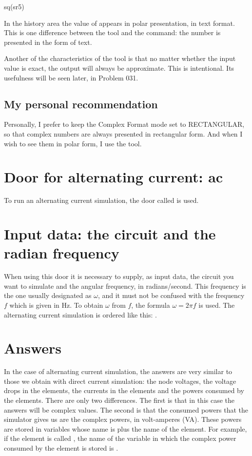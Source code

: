 \begin{entry}
sq\absang(sr5)
\end{entry}

In the history area the value of  appears in polar
presentation, in text format. This is one difference between the
 tool and the  command: the number is
presented in the form of text.

Another of the characteristics of the  tool is that no
matter whether the input value is exact, the output will always be
approximate. This is intentional. Its usefulness will be seen later,
in Problem 031.

\subsection{My personal recommendation}

Personally, I prefer to keep the Complex Format mode set to
RECTANGULAR, so that complex numbers are always presented in
rectangular form. And when I wish to see them in polar form, I use
the  tool.

\section{Door for alternating current: ac}

To run an alternating current simulation, the door called
 is used.

\section{Input data: the circuit and the radian frequency}

When using this door it is necessary to supply, as input data, the
circuit you want to simulate and the angular frequency, in
radians/second. This frequency is the one usually designated as
$\omega$, and it must not be confused with the frequency $f$ which
is given in Hz. To obtain $\omega$ from $f$, the formula
$\omega = 2\pi f$ is used. The alternating current simulation is
ordered like this: .

\section{Answers}

In the case of alternating current simulation, the answers are very
similar to those we obtain with direct current simulation: the node
voltages, the voltage drops in the elements, the currents in the
elements and the powers consumed by the elements. There are only two
differences. The first is that in this case the answers will be
complex values. The second is that the consumed powers that the
simulator gives us are the complex powers, in volt-amperes (VA).
These powers are stored in variables whose name is  plus the
name of the element. For example, if the element is called
, the name of the variable in which the complex power
consumed by the element is stored is .

